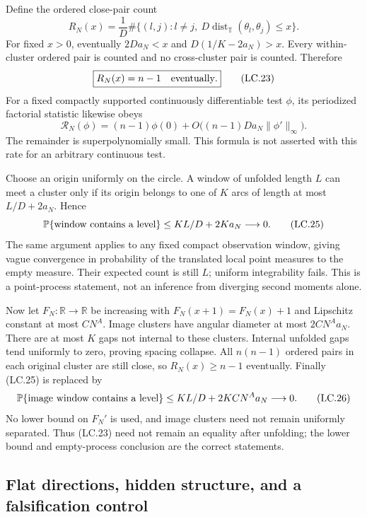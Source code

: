 Define the ordered close-pair count \[
 R_N(x)=\frac1D\#\{(l,j):l\ne j,\ D\operatorname{dist}_{\mathbb T}
                         (\theta_l,\theta_j)\leq x\}.
\] For fixed \(x>0\), eventually \(2Da_N<x\) and \(D(1/K-2a_N)>x\). Every within-cluster ordered pair is counted and no cross-cluster pair is counted. Therefore \[
 \boxed{R_N(x)=n-1\quad\hbox{eventually}.}                   \tag{LC.23}
\] For a fixed compactly supported continuously differentiable test \(\phi\), its periodized factorial statistic likewise obeys \[
 \mathcal R_N(\phi)=(n-1)\phi(0)
       +O\bigl((n-1)Da_N\|\phi'\|_\infty\bigr).             \tag{LC.24}
\] The remainder is superpolynomially small. This formula is not asserted with this rate for an arbitrary continuous test.

Choose an origin uniformly on the circle. A window of unfolded length \(L\) can meet a cluster only if its origin belongs to one of \(K\) arcs of length at most \(L/D+2a_N\). Hence \[
 \mathbb P\{\hbox{window contains a level}\}
       \leq KL/D+2Ka_N\longrightarrow0.                     \tag{LC.25}
\] The same argument applies to any fixed compact observation window, giving vague convergence in probability of the translated local point measures to the empty measure. Their expected count is still \(L\); uniform integrability fails. This is a point-process statement, not an inference from diverging second moments alone.

Now let \(F_N:\mathbb R\to\mathbb R\) be increasing with \(F_N(x+1)=F_N(x)+1\) and Lipschitz constant at most \(C N^A\). Image clusters have angular diameter at most \(2CN^Aa_N\). There are at most \(K\) gaps not internal to these clusters. Internal unfolded gaps tend uniformly to zero, proving spacing collapse. All \(n(n-1)\) ordered pairs in each original cluster are still close, so \(R_N(x)\geq n-1\) eventually. Finally (LC.25) is replaced by \[
 \mathbb P\{\hbox{image window contains a level}\}
       \leq KL/D+2KCN^Aa_N\longrightarrow0.                 \tag{LC.26}
\] No lower bound on \(F_N'\) is used, and image clusters need not remain uniformly separated. Thus (LC.23) need not remain an equality after unfolding; the lower bound and empty-process conclusion are the correct statements.

\subsection{Flat directions, hidden structure, and a falsification control}\label{locality:flat-directions-hidden-structure-and-a-falsification-control}

